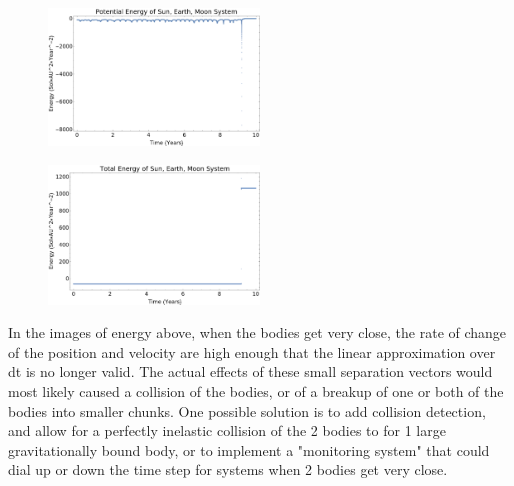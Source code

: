 \documentclass{article}
\begin{document}
\begin{figure}[!htb]
	\begin{center}
		\includegraphics[width=0.5\textwidth]{p2-1d.pdf}
	\end{center}
	\caption{}
\label{fig:qual}
\end{figure}
\FloatBarrier


\begin{figure}[!htb]
	\begin{center}
		\includegraphics[width=0.5\textwidth]{p2-1e.pdf}
	\end{center}
	\caption{}
\label{fig:qual}
\end{figure}
\FloatBarrier

In the images of energy above, when the bodies get very close, the rate of change of the position and velocity are high enough that the linear approximation over dt is no longer valid. The actual effects of these small separation vectors would most likely caused a collision of the bodies, or of a breakup of one or both of the bodies into smaller chunks. One possible solution is to add collision detection, and allow for a perfectly inelastic collision of the 2 bodies to for 1 large gravitationally bound body, or to implement a "monitoring system" that could dial up or down the time step for systems when 2 bodies get very close.
\end{document}
